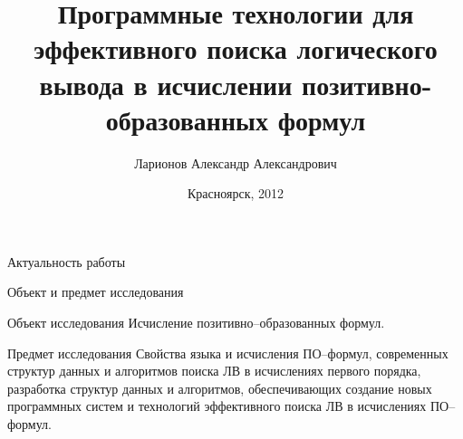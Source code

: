 \documentclass{beamer}
\begin{document}
\title{Программные технологии для эффективного поиска логического вывода в исчислении позитивно-образованных формул}  
\author{Ларионов Александр Александрович}
\date{Красноярск, 2012} 
\frame{\titlepage} 


\begin{frame}{Актуальность работы}
\end{frame}


\begin{frame}{Объект и предмет исследования}

\begin{block}{Объект исследования}
Исчисление позитивно--образованных формул. 
\end{block}

\begin{block}{Предмет исследования}
Свойства языка и исчисления ПО--формул, современных структур данных и алгоритмов поиска ЛВ в исчислениях первого порядка, разработка структур данных и алгоритмов, обеспечивающих создание новых программных систем и технологий эффективного поиска ЛВ в исчислениях ПО--формул. 
\end{block}

\end{frame}
\end{document}
